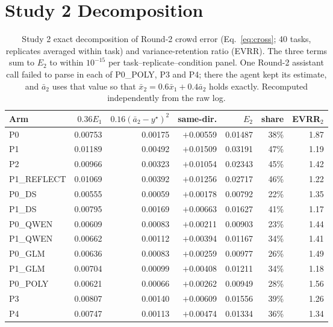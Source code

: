 \documentclass[10pt]{article}
\newenvironment{fittable}{\begin{lrbox}{\manuscripttable}}{%
\end{lrbox}\ifdim\wd\manuscripttable>\linewidth
\resizebox{\linewidth}{!}{\usebox{\manuscripttable}}%
\else\usebox{\manuscripttable}\fi}
\theoremstyle{manuscript}\newtheorem{proposition}{Proposition}
\begin{document}
\section{Study 2 Decomposition}\label{app:s2}
\begin{table}[ht]\centering\small\setlength{\tabcolsep}{5pt}
\caption{Study 2 exact decomposition of Round-2 crowd error (Eq.~\ref{eq:cross}; 40 tasks, replicates averaged within task) and variance-retention ratio (EVRR). The three terms sum to $E_2$ to within $10^{-15}$ per task--replicate--condition panel. One Round-2 assistant call failed to parse in each of P0\_POLY, P3 and P4; there the agent kept its estimate, and $\bar a_2$ uses that value so that $\bar x_2=0.6\bar x_1+0.4\bar a_2$ holds exactly. Recomputed independently from the raw log.}\label{tab:decomp2}
\begin{fittable}
\begin{tabular}{@{}lrrrrrr@{}}\toprule
Arm & $0.36E_1$ & $0.16(\bar a_2-y^\star)^2$ & same-dir. & $E_2$ & share & EVRR$_2$\\\midrule
P0 & 0.00753 & 0.00175 & $+$0.00559 & 0.01487 & 38\% & 1.87\\
P1 & 0.01189 & 0.00492 & $+$0.01509 & 0.03191 & 47\% & 1.19\\
P2 & 0.00966 & 0.00323 & $+$0.01054 & 0.02343 & 45\% & 1.42\\
P1\_REFLECT & 0.01069 & 0.00392 & $+$0.01256 & 0.02717 & 46\% & 1.22\\
P0\_DS & 0.00555 & 0.00059 & $+$0.00178 & 0.00792 & 22\% & 1.35\\
P1\_DS & 0.00795 & 0.00169 & $+$0.00663 & 0.01627 & 41\% & 1.17\\
P0\_QWEN & 0.00609 & 0.00083 & $+$0.00211 & 0.00903 & 23\% & 1.44\\
P1\_QWEN & 0.00662 & 0.00112 & $+$0.00394 & 0.01167 & 34\% & 1.41\\
P0\_GLM & 0.00636 & 0.00083 & $+$0.00259 & 0.00977 & 26\% & 1.49\\
P1\_GLM & 0.00704 & 0.00099 & $+$0.00408 & 0.01211 & 34\% & 1.18\\
P0\_POLY & 0.00621 & 0.00066 & $+$0.00262 & 0.00949 & 28\% & 1.56\\
P3 & 0.00807 & 0.00140 & $+$0.00609 & 0.01556 & 39\% & 1.26\\
P4 & 0.00747 & 0.00113 & $+$0.00474 & 0.01334 & 36\% & 1.34\\\bottomrule
\end{tabular}
\end{fittable}
\end{table}
\end{document}
